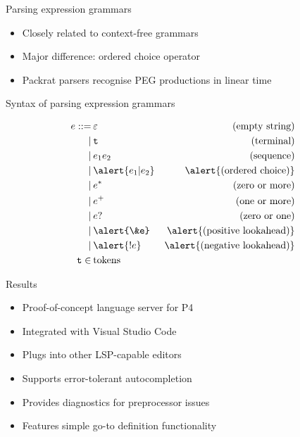 \documentclass[aspectratio=169]{beamer}
\begin{document}
\begin{frame}{Parsing expression grammars}
	\begin{itemize}
		\item Closely related to context-free grammars \pause
		\item Major difference: \alert{ordered choice} operator \pause
		\item Packrat parsers recognise PEG productions in linear time
	\end{itemize}
\end{frame}

\begin{frame}{Syntax of parsing expression grammars}
	\centering
	\begin{overprint}
	\begin{align*}
		e ::= & \hspace{2pt} \varepsilon & \text{(empty string)} \\
		\mid  & \hspace{2pt} \texttt{t}  & \text{(terminal)} \\
		\mid  & \hspace{2pt} e_1 e_2     & \text{(sequence)} \\
		\mid  & \hspace{2pt} \alert{e_1 | e_2} & \alert{\text{(ordered choice)}} \\
		\mid  & \hspace{2pt} e^*         & \text{(zero or more)} \\
		\mid  & \hspace{2pt} e^+         & \text{(one or more)} \\
		\mid  & \hspace{2pt} e?          & \text{(zero or one)} \\
		\mid  & \hspace{2pt} \alert{\&e} & \alert{\text{(positive lookahead)}} \\
		\mid  & \hspace{2pt} \alert{!e}  & \alert{\text{(negative lookahead)}} \\
		\texttt{t} \in & \hspace{2pt} \text{tokens}
	\end{align*}
	\end{overprint}
\end{frame}

\begin{frame}{Results}
	\begin{itemize}
		\item Proof-of-concept language server for P4 \pause
		\item Integrated with Visual Studio Code \pause
		\item Plugs into other LSP-capable editors \pause
		\item Supports \alert{error-tolerant autocompletion} \pause
		\item Provides diagnostics for preprocessor issues \pause
		\item Features simple go-to definition functionality
	\end{itemize}
\end{frame}
\end{document}

